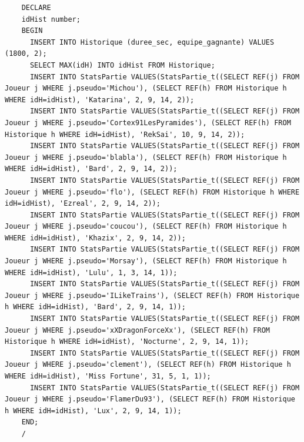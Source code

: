 \documentclass[a4paper,10pt]{report}
\begin{document}
\begin{lstlisting}
    DECLARE
    idHist number;
    BEGIN
      INSERT INTO Historique (duree_sec, equipe_gagnante) VALUES (1800, 2);
      SELECT MAX(idH) INTO idHist FROM Historique;
      INSERT INTO StatsPartie VALUES(StatsPartie_t((SELECT REF(j) FROM Joueur j WHERE j.pseudo='Michou'), (SELECT REF(h) FROM Historique h WHERE idH=idHist), 'Katarina', 2, 9, 14, 2));
      INSERT INTO StatsPartie VALUES(StatsPartie_t((SELECT REF(j) FROM Joueur j WHERE j.pseudo='Cortex91LesPyramides'), (SELECT REF(h) FROM Historique h WHERE idH=idHist), 'RekSai', 10, 9, 14, 2));
      INSERT INTO StatsPartie VALUES(StatsPartie_t((SELECT REF(j) FROM Joueur j WHERE j.pseudo='blabla'), (SELECT REF(h) FROM Historique h WHERE idH=idHist), 'Bard', 2, 9, 14, 2));
      INSERT INTO StatsPartie VALUES(StatsPartie_t((SELECT REF(j) FROM Joueur j WHERE j.pseudo='flo'), (SELECT REF(h) FROM Historique h WHERE idH=idHist), 'Ezreal', 2, 9, 14, 2));
      INSERT INTO StatsPartie VALUES(StatsPartie_t((SELECT REF(j) FROM Joueur j WHERE j.pseudo='coucou'), (SELECT REF(h) FROM Historique h WHERE idH=idHist), 'Khazix', 2, 9, 14, 2));
      INSERT INTO StatsPartie VALUES(StatsPartie_t((SELECT REF(j) FROM Joueur j WHERE j.pseudo='Morsay'), (SELECT REF(h) FROM Historique h WHERE idH=idHist), 'Lulu', 1, 3, 14, 1));
      INSERT INTO StatsPartie VALUES(StatsPartie_t((SELECT REF(j) FROM Joueur j WHERE j.pseudo='ILikeTrains'), (SELECT REF(h) FROM Historique h WHERE idH=idHist), 'Bard', 2, 9, 14, 1));
      INSERT INTO StatsPartie VALUES(StatsPartie_t((SELECT REF(j) FROM Joueur j WHERE j.pseudo='xXDragonForceXx'), (SELECT REF(h) FROM Historique h WHERE idH=idHist), 'Nocturne', 2, 9, 14, 1));
      INSERT INTO StatsPartie VALUES(StatsPartie_t((SELECT REF(j) FROM Joueur j WHERE j.pseudo='clement'), (SELECT REF(h) FROM Historique h WHERE idH=idHist), 'Miss Fortune', 31, 5, 1, 1));
      INSERT INTO StatsPartie VALUES(StatsPartie_t((SELECT REF(j) FROM Joueur j WHERE j.pseudo='FlamerDu93'), (SELECT REF(h) FROM Historique h WHERE idH=idHist), 'Lux', 2, 9, 14, 1));
    END;
    /

\end{lstlisting}
\end{document}
